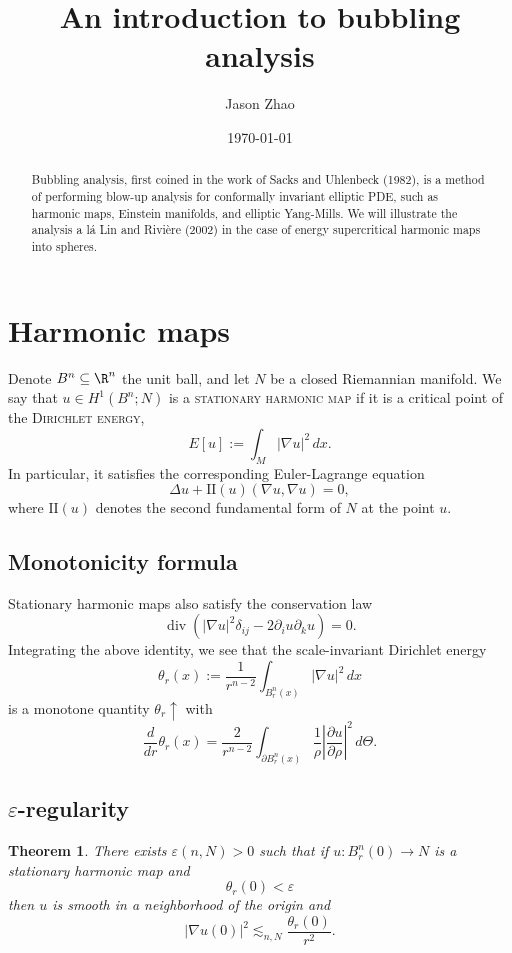 \documentclass[reqno]{amsart}
\title
{
	An introduction to bubbling analysis
}
\author{Jason Zhao}
\date{\today}
\newtheorem{theorem}{Theorem}
\theoremstyle{definition}
\theoremstyle{remark}
\renewcommand{\epsilon}{\varepsilon}
\renewcommand{\emph}{\textsc}
\begin{document}
\maketitle

\begin{abstract}
	Bubbling analysis, first coined in the work of Sacks and Uhlenbeck (1982), is a method of performing blow-up analysis for conformally invariant elliptic PDE, such as harmonic maps, Einstein manifolds, and elliptic Yang-Mills. We will illustrate the analysis a lá Lin and Rivière (2002) in the case of energy supercritical harmonic maps into spheres.
\end{abstract}

\tableofcontents

\section{Harmonic maps}

Denote $B^n \subseteq \R^n$ the unit ball, and let $N$ be a closed Riemannian manifold. We say that $u \in H^1 (B^n; N)$ is a \emph{stationary harmonic map} if it is a critical point of the \emph{Dirichlet energy},
	\[ E[u] := \int_M |\nabla u|^2 \, dx. \]
In particular, it satisfies the corresponding Euler-Lagrange equation 
	\[ \Delta u + \text{II} (u) (\nabla u, \nabla u) = 0, \]	
where $\text{II} (u)$ denotes the second fundamental form of $N$ at the point $u$.

\subsection{Monotonicity formula}

Stationary harmonic maps also satisfy the conservation law
	\[ \operatorname{div} \left(  |\nabla u|^2  \delta_{ij} - 2 \partial_i u \partial_k u \right) = 0. \]
Integrating the above identity, we see that the scale-invariant Dirichlet energy
	\[ \theta_r (x) := \frac{1}{r^{n - 2}} \int_{B^n_r (x)} |\nabla u|^2 \, dx \]
is a monotone quantity $\theta_r \uparrow$ with 
	\[ \frac{d}{dr} \theta_r (x) = \frac{2}{r^{n - 2}} \int_{\partial B^n_r (x)} \frac{1}{\rho} \left| \frac{\partial u}{\partial \rho} \right|^2 \, d\Theta.\]	

\subsection{$\epsilon$-regularity}

\begin{theorem}
	There exists $\epsilon (n, N) > 0$ such that if $u: B_r^n (0) \to N$ is a stationary harmonic map and 
		\[ \theta_r (0) < \epsilon \]
	then $u$ is smooth in a neighborhood of the origin and 
		\[ |\nabla u(0)|^2 \lesssim_{n, N} \frac{\theta_r (0)}{r^2}.\]	
\end{theorem}	
\end{document}
